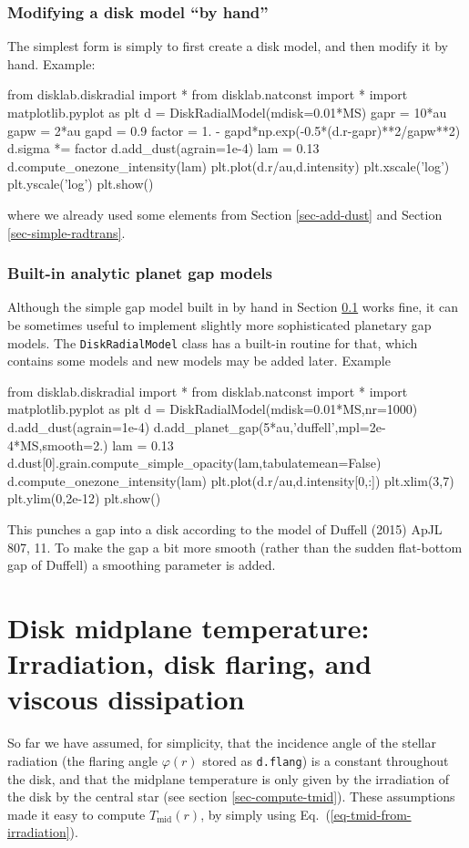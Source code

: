 \documentclass{book}
\newcommand{\code}[1]{{\small\tt #1}}
\begin{document}
\subsection{Modifying a disk model ``by hand''}\label{sec-modif-by-hand}
The simplest form is simply to first create a disk model, and then modify
it by hand. Example:
\begin{codebox}
from disklab.diskradial import *
from disklab.natconst import *
import matplotlib.pyplot as plt
d = DiskRadialModel(mdisk=0.01*MS)
gapr = 10*au
gapw = 2*au
gapd = 0.9
factor = 1. - gapd*np.exp(-0.5*(d.r-gapr)**2/gapw**2)
d.sigma *= factor
d.add_dust(agrain=1e-4)
lam = 0.13
d.compute_onezone_intensity(lam)
plt.plot(d.r/au,d.intensity)
plt.xscale('log')
plt.yscale('log')
plt.show()
\end{codebox}
\noindent where we already used some elements from Section \ref{sec-add-dust} and
Section \ref{sec-simple-radtrans}.

\subsection{Built-in analytic planet gap models}
Although the simple gap model built in by hand in Section \ref{sec-modif-by-hand}
works fine, it can be sometimes useful to implement slightly more sophisticated
planetary gap models. The \code{DiskRadialModel} class has a built-in routine for that,
which contains some models and new models may be added later. Example
\begin{codebox}
from disklab.diskradial import *
from disklab.natconst import *
import matplotlib.pyplot as plt
d = DiskRadialModel(mdisk=0.01*MS,nr=1000)
d.add_dust(agrain=1e-4)
d.add_planet_gap(5*au,'duffell',mpl=2e-4*MS,smooth=2.)
lam = 0.13
d.dust[0].grain.compute_simple_opacity(lam,tabulatemean=False)
d.compute_onezone_intensity(lam)
plt.plot(d.r/au,d.intensity[0,:])
plt.xlim(3,7)
plt.ylim(0,2e-12)
plt.show()
\end{codebox}
This punches a gap into a disk according to the model of Duffell (2015) ApJL
807, 11. To make the gap a bit more smooth (rather than the sudden flat-bottom
gap of Duffell) a smoothing parameter is added.

\chapter{Disk midplane temperature: Irradiation, disk flaring, and viscous dissipation}
\label{sec-irradiation-flaring-viscous-heating}
%
So far we have assumed, for simplicity, that the incidence angle of the stellar
radiation (the flaring angle $\varphi(r)$ stored as \code{d.flang}) is a
constant throughout the disk, and that the midplane temperature is only given by
the irradiation of the disk by the central star (see section
\ref{sec-compute-tmid}). These assumptions made it easy to compute
$T_{\mathrm{mid}}(r)$, by simply using Eq.~(\ref{eq-tmid-from-irradiation}).
\end{document}
